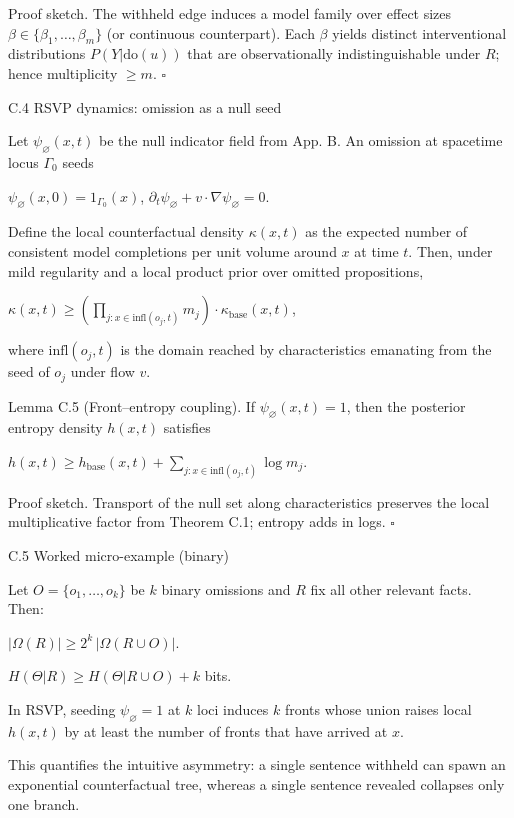 \documentclass[11pt,a4paper]{article}
\begin{document}
Proof sketch. The withheld edge induces a model family over effect sizes $\beta \in \{\beta_1, \dots, \beta_m\}$ (or continuous counterpart). Each $\beta$ yields distinct interventional distributions $P(Y | \mathrm{do}(u))$ that are observationally indistinguishable under $R$; hence multiplicity $\geq m$. $\square$

C.4 RSVP dynamics: omission as a null seed

Let $\psi_\varnothing(x,t)$ be the null indicator field from App. B. An omission at spacetime locus $\Gamma_0$ seeds

$\psi_\varnothing(x,0) = 1_{\Gamma_0}(x)$, $\partial_t \psi_\varnothing + v \cdot \nabla \psi_\varnothing = 0$.

Define the local counterfactual density $\kappa(x,t)$ as the expected number of consistent model completions per unit volume around $x$ at time $t$. Then, under mild regularity and a local product prior over omitted propositions,

$\kappa(x,t) \geq \left( \prod_{j: x \in \mathrm{infl}(o_j,t)} m_j \right) \cdot \kappa_{\mathrm{base}}(x,t)$,

where $\mathrm{infl}(o_j,t)$ is the domain reached by characteristics emanating from the seed of $o_j$ under flow $v$.

Lemma C.5 (Front–entropy coupling).
If $\psi_\varnothing(x,t) = 1$, then the posterior entropy density $h(x,t)$ satisfies

$h(x,t) \geq h_{\mathrm{base}}(x,t) + \sum_{j: x \in \mathrm{infl}(o_j,t)} \log m_j$.

Proof sketch. Transport of the null set along characteristics preserves the local multiplicative factor from Theorem C.1; entropy adds in logs. $\square$

C.5 Worked micro-example (binary)

Let $O = \{o_1, \dots, o_k\}$ be $k$ binary omissions and $R$ fix all other relevant facts. Then:

$|\Omega(R)| \geq 2^k \, |\Omega(R \cup O)|$.

$H(\Theta | R) \geq H(\Theta | R \cup O) + k$ bits.

In RSVP, seeding $\psi_\varnothing = 1$ at $k$ loci induces $k$ fronts whose union raises local $h(x,t)$ by at least the number of fronts that have arrived at $x$.

This quantifies the intuitive asymmetry: a single sentence withheld can spawn an exponential counterfactual tree, whereas a single sentence revealed collapses only one branch.
\end{document}
